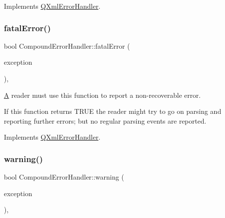 Implements \mbox{\hyperlink{class_q_xml_error_handler_a7b265803d41782e6207b497fe09beff0}{Q\+Xml\+Error\+Handler}}.

\mbox{\label{class_compound_error_handler_a64adb9938c3f3e70a76cc4a224f0d093}} 
\subsubsection{\texorpdfstring{fatalError()}{fatalError()}}
{\footnotesize\ttfamily bool Compound\+Error\+Handler\+::fatal\+Error (\begin{DoxyParamCaption}\item[{const \mbox{\hyperlink{class_q_xml_parse_exception}{Q\+Xml\+Parse\+Exception}} \&}]{exception }\end{DoxyParamCaption})\hspace{0.3cm}{\ttfamily [inline]}, {\ttfamily [virtual]}}

\mbox{\hyperlink{class_a}{A}} reader must use this function to report a non-\/recoverable error.

If this function returns T\+R\+UE the reader might try to go on parsing and reporting further errors; but no regular parsing events are reported. 

Implements \mbox{\hyperlink{class_q_xml_error_handler_aaa8c1ad1b42a5257cf2344c7fe101797}{Q\+Xml\+Error\+Handler}}.

\mbox{\label{class_compound_error_handler_a80ccb953cac3ead66ae9c8892d8e3c03}} 
\subsubsection{\texorpdfstring{warning()}{warning()}}
{\footnotesize\ttfamily bool Compound\+Error\+Handler\+::warning (\begin{DoxyParamCaption}\item[{const \mbox{\hyperlink{class_q_xml_parse_exception}{Q\+Xml\+Parse\+Exception}} \&}]{exception }\end{DoxyParamCaption})\hspace{0.3cm}{\ttfamily [inline]}, {\ttfamily [virtual]}}

